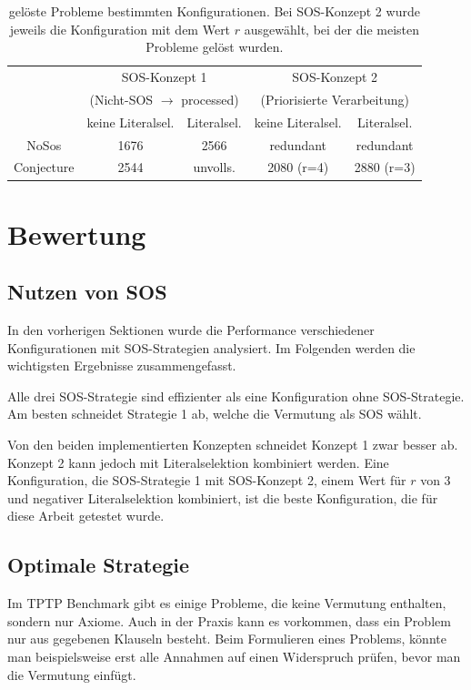 	\begin{table}[h]
		\centering
		\begin{tabular}{|c|c|c|c|c|}
			\hline
			& \multicolumn{2}{c|}{SOS-Konzept 1} & \multicolumn{2}{c|}{SOS-Konzept 2} \\
			& \multicolumn{2}{c|}{(Nicht-SOS $\rightarrow$ processed)} & \multicolumn{2}{c|}{(Priorisierte Verarbeitung)}  \\
			\hline
			& keine Literalsel. & Literalsel. & keine Literalsel. & Literalsel. \\
			\hline\hline
			NoSos & 1676 & 2566 & redundant & redundant \\
			\hline
			Conjecture & 2544 & unvolls. & 2080 (r=4) & 2880 (r=3) \\
			\hline
		\end{tabular}
		\label{table:resultConfigs}
		\caption{gelöste Probleme bestimmten Konfigurationen. Bei SOS-Konzept 2 wurde jeweils die Konfiguration mit dem Wert $r$ ausgewählt, bei der die meisten Probleme gelöst wurden.}
	\end{table}
	
		
\section{Bewertung}
	\subsection{Nutzen von SOS}
	In den vorherigen Sektionen wurde die Performance verschiedener Konfigurationen mit SOS-Strategien analysiert. Im Folgenden werden die wichtigsten Ergebnisse zusammengefasst.
	
	Alle drei SOS-Strategie sind effizienter als eine Konfiguration ohne SOS-Strategie. Am besten schneidet Strategie 1 ab, welche die Vermutung als SOS wählt. 
	
	Von den beiden implementierten Konzepten schneidet Konzept 1 zwar besser ab. Konzept 2 kann jedoch mit Literalselektion kombiniert werden. Eine Konfiguration, die SOS-Strategie 1 mit SOS-Konzept 2, einem Wert für $r$ von 3 und negativer Literalselektion kombiniert, ist die beste Konfiguration, die für diese Arbeit getestet wurde.
	
	\subsection{Optimale Strategie}
	Im TPTP Benchmark gibt es einige Probleme, die keine Vermutung enthalten, sondern nur Axiome. Auch in der Praxis kann es vorkommen, dass ein Problem nur aus gegebenen Klauseln besteht. Beim Formulieren eines Problems, könnte man beispielsweise erst alle Annahmen auf einen Widerspruch prüfen, bevor man die Vermutung einfügt.
	

